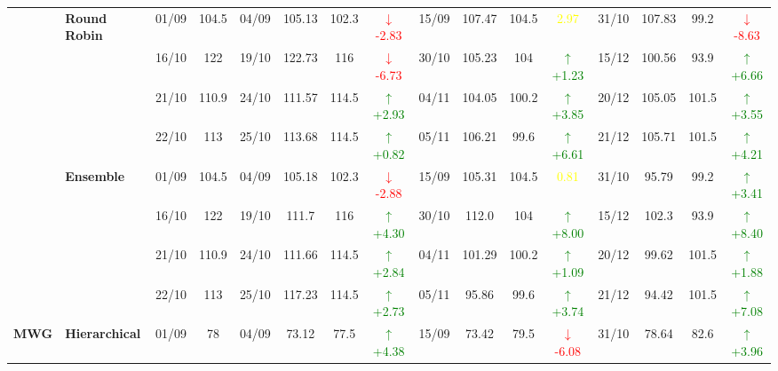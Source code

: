 \documentclass{ieeeaccess}
\begin{document}
{\begin{longtable}{llcc|cccc|cccc|cccc}
& \textbf{Round Robin}
& 01/09 & 104.5 & 04/09 & 105.13 & 102.3 & \textcolor{red}{\(\downarrow\)-2.83} & 15/09 & 107.47 & 104.5 & \textcolor{yellow}{2.97} & 31/10 & 107.83 & 99.2 & \textcolor{red}{\(\downarrow\)-8.63} \\

&
& 16/10 & 122 & 19/10 & 122.73 & 116 & \textcolor{red}{\(\downarrow\)-6.73} & 30/10 & 105.23 & 104 & \textcolor{green}{\(\uparrow\)+1.23} & 15/12 & 100.56 & 93.9 & \textcolor{green}{\(\uparrow\)+6.66} \\

&
& 21/10 & 110.9 & 24/10 & 111.57 & 114.5 & \textcolor{green}{\(\uparrow\)+2.93} & 04/11 & 104.05 & 100.2 & \textcolor{green}{\(\uparrow\)+3.85} & 20/12 & 105.05 & 101.5 & \textcolor{green}{\(\uparrow\)+3.55} \\

&
& 22/10 & 113 & 25/10 & 113.68 & 114.5 & \textcolor{green}{\(\uparrow\)+0.82} & 05/11 & 106.21 & 99.6 & \textcolor{green}{\(\uparrow\)+6.61} & 21/12 & 105.71 & 101.5 & \textcolor{green}{\(\uparrow\)+4.21} \\
\cmidrule(lr){2-16}


& \textbf{Ensemble}
& 01/09 & 104.5 & 04/09 & 105.18 & 102.3 & \textcolor{red}{\(\downarrow\)-2.88} & 15/09 & 105.31 & 104.5 & \textcolor{yellow}{0.81} & 31/10 & 95.79 & 99.2 & \textcolor{green}{\(\uparrow\)+3.41} \\

&
& 16/10 & 122 & 19/10 & 111.7 & 116 & \textcolor{green}{\(\uparrow\)+4.30} & 30/10 & 112.0 & 104 & \textcolor{green}{\(\uparrow\)+8.00} & 15/12 & 102.3 & 93.9 & \textcolor{green}{\(\uparrow\)+8.40} \\

&
& 21/10 & 110.9 & 24/10 & 111.66 & 114.5 & \textcolor{green}{\(\uparrow\)+2.84} & 04/11 & 101.29 & 100.2 & \textcolor{green}{\(\uparrow\)+1.09} & 20/12 & 99.62 & 101.5 & \textcolor{green}{\(\uparrow\)+1.88} \\

&
& 22/10 & 113 & 25/10 & 117.23 & 114.5 & \textcolor{green}{\(\uparrow\)+2.73} & 05/11 & 95.86 & 99.6 & \textcolor{green}{\(\uparrow\)+3.74} & 21/12 & 94.42 & 101.5 & \textcolor{green}{\(\uparrow\)+7.08} \\
\midrule




\multirow{12}{*}{\textbf{MWG}} 
& \textbf{Hierarchical}
& 01/09 & 78 & 04/09 & 73.12 & 77.5 & \textcolor{green}{\(\uparrow\)+4.38} & 15/09 & 73.42 & 79.5 & \textcolor{red}{\(\downarrow\)-6.08} & 31/10 & 78.64 & 82.6 & \textcolor{green}{\(\uparrow\)+3.96} \\


\end{longtable}}
\end{document}
